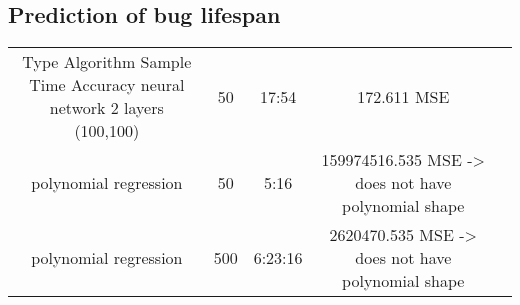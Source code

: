 \subsection{Prediction of bug lifespan} %
\label{sub:Prediction of bug lifespan}
\begin{tabular}{|c|c|c|c|c|}
\hline
Type             Algorithm         Sample    Time    Accuracy
\hline
\hline
neural network 2 layers (100,100)  & 50     &  17:54 & 172.611 MSE \\
polynomial regression              & 50     &  5:16  & 159974516.535  MSE  -> does not have polynomial shape \\
polynomial regression              & 500    &  6:23:16 & 2620470.535  MSE  -> does not have polynomial shape\\
\hline
\end{tabular}
